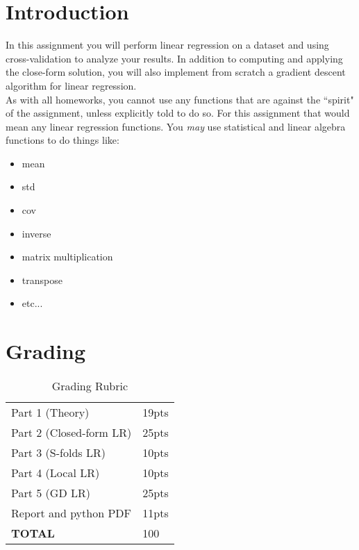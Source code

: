 \documentclass[12pt]{article}
\begin{document}
\maketitle


\section*{Introduction}
In this assignment you will perform linear regression on a dataset and using cross-validation to analyze your results.  In addition to computing and applying the close-form solution, you will also implement from scratch a gradient descent algorithm for linear regression.\\

\noindent
As with all homeworks, you cannot use any functions that are against the ``spirit" of the assignment, unless explicitly told to do so.  For this assignment that would mean any linear regression functions.   You \emph{may} use statistical and linear algebra functions to do things like:
\begin{itemize}
\item mean
\item std
\item cov
\item inverse
\item matrix multiplication
\item transpose
\item etc...
\end{itemize}


\section*{Grading}
\begin{table}[h]
\begin{center}
\begin{tabular}{|l|l|}
\hline
Part 1 (Theory) & 19pts\\
Part 2 (Closed-form LR) & 25pts\\
Part 3 (S-folds LR) & 10pts\\
Part 4 (Local LR) & 10pts\\
Part 5 (GD LR) & 25pts\\
Report and python PDF & 11pts\\
\hline
\textbf{TOTAL} & 100 \\
\hline
\end{tabular}
\caption{Grading Rubric}
\end{center}
\end{table}
\end{document}
